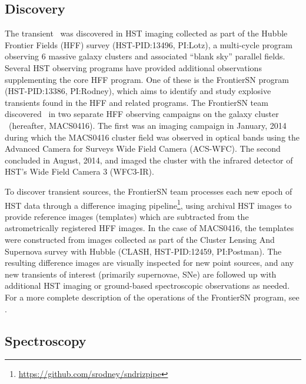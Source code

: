 \subsection{Discovery}\label{sec:Discovery}

The transient \spock\ was discovered in HST imaging collected as part
of the Hubble Frontier Fields (HFF) survey (HST-PID:13496, PI:Lotz), a
multi-cycle program observing 6 massive galaxy clusters and associated
``blank sky'' parallel fields.  Several HST observing programs have
provided additional observations supplementing the core HFF program.
One of these is the FrontierSN program (HST-PID:13386, PI:Rodney),
which aims to identify and study explosive transients found in the HFF
and related programs.  The FrontierSN team discovered \spock\ in two
separate HFF observing campaigns on the galaxy cluster
\ (hereafter, MACS0416).  The first was an imaging campaign
in January, 2014 during which the MACS0416 cluster field was observed
in optical bands using the Advanced Camera for Surveys Wide Field
Camera (ACS-WFC).  The second concluded in August, 2014, and imaged
the cluster with the infrared detector of HST's Wide Field Camera 3
(WFC3-IR).

To discover transient sources, the FrontierSN team processes each new
epoch of HST data through a difference imaging
pipeline\footnote{\url{https://github.com/srodney/sndrizpipe}}, using
archival HST images to provide reference images (templates) which are
subtracted from the astrometrically registered HFF images. In the case
of MACS0416, the templates were constructed from images collected as
part of the Cluster Lensing And Supernova survey with Hubble (CLASH,
HST-PID:12459, PI:Postman). The resulting difference images are
visually inspected for new point sources, and any new transients of
interest (primarily supernovae, SNe) are followed up with additional
HST imaging or ground-based spectroscopic observations as needed.  For
a more complete description of the operations of the FrontierSN
program, see \citet{Rodney:2015a}.

\subsection{Spectroscopy}\label{sec:Spectroscopy}

